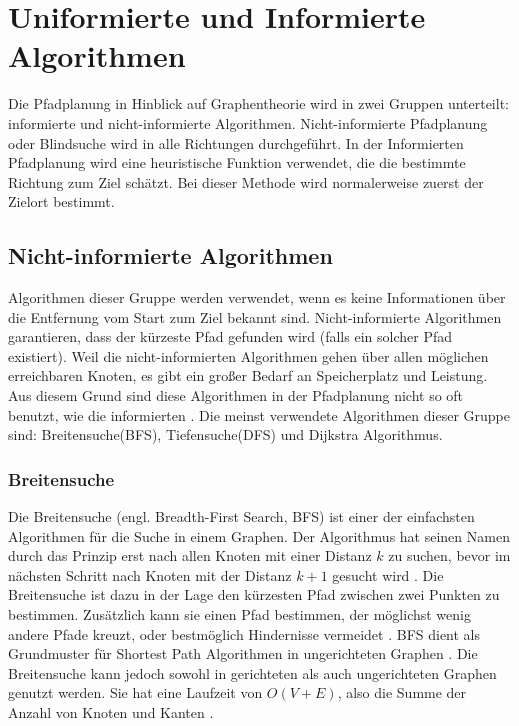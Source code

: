 \chapter{Uniformierte und Informierte Algorithmen}

Die Pfadplanung in Hinblick auf Graphentheorie wird in zwei Gruppen unterteilt: informierte und nicht-informierte Algorithmen. Nicht-informierte Pfadplanung oder Blindsuche wird in alle Richtungen durchgeführt. In der Informierten Pfadplanung wird eine heuristische Funktion verwendet, die die bestimmte Richtung zum Ziel schätzt. Bei dieser Methode wird normalerweise zuerst der Zielort bestimmt\cite{comAnal}.

\section{Nicht-informierte Algorithmen}
Algorithmen dieser Gruppe werden verwendet, wenn es keine Informationen über die Entfernung vom Start zum Ziel bekannt sind. Nicht-informierte Algorithmen garantieren, dass der kürzeste Pfad gefunden wird (falls ein solcher Pfad existiert)\cite{comAnal}. Weil die nicht-informierten Algorithmen gehen über allen möglichen erreichbaren Knoten, es gibt ein großer Bedarf an Speicherplatz und Leistung. Aus diesem Grund sind diese Algorithmen in der Pfadplanung nicht so oft benutzt, wie die informierten\cite{sim} \cite{comAnal}. Die meinst verwendete Algorithmen dieser Gruppe sind: Breitensuche(BFS), Tiefensuche(DFS) und Dijkstra Algorithmus.

\subsection{Breitensuche}

Die Breitensuche (engl. Breadth-First Search, BFS) ist einer der einfachsten Algorithmen für die Suche in einem Graphen. Der Algorithmus hat seinen Namen durch das Prinzip erst nach allen Knoten mit einer Distanz $k$ zu suchen, bevor im nächsten Schritt nach Knoten mit der Distanz $k + 1$ gesucht wird \cite{Cormen.2009}. Die Breitensuche ist dazu in der Lage den kürzesten Pfad zwischen zwei Punkten zu bestimmen. Zusätzlich kann sie einen Pfad bestimmen, der möglichst wenig andere Pfade kreuzt, oder bestmöglich Hindernisse vermeidet \cite{Lee.1961}. BFS dient als Grundmuster für Shortest Path Algorithmen in ungerichteten Graphen \cite{Ottmann.2017}. Die Breitensuche kann jedoch sowohl in gerichteten als auch ungerichteten Graphen genutzt werden. Sie hat eine Laufzeit von $O(V + E)$, also die Summe der Anzahl von Knoten und Kanten \cite{Cormen.2009}.

